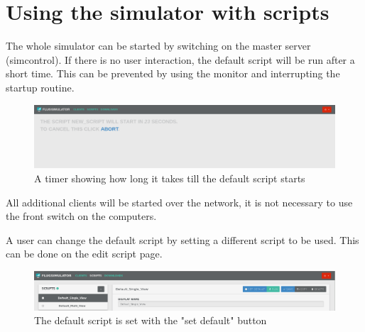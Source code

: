 \documentclass[accentcolor=tud1a, paper=a4, colorback]{tudreport}
\begin{document}
	\chapter{Using the simulator with scripts}
	The whole simulator can be started by switching on the master server (simcontrol).
	If there is no user interaction, the default script will be run after a short time.
	This can be prevented by using the monitor and interrupting the startup routine.
	\begin{figure}[H]
		\centering
		\includegraphics[width=.9\textwidth]{script_run_with_timer}
		\caption{A timer showing how long it takes till the default script starts}
		\label{script_run_with_timer}
	\end{figure}
	All additional clients will be started over the network, it is not necessary to use the
	front switch on the computers.

	A user can change the default script by setting a different script to be used.
	This can be done on the edit script page.
	\begin{figure}[H]
		\centering
		\includegraphics[width=.9\textwidth]{default_script_setting}
		\caption{The default script is set with the "set default" button}
		\label{default_script_setting}
	\end{figure}
\end{document}
